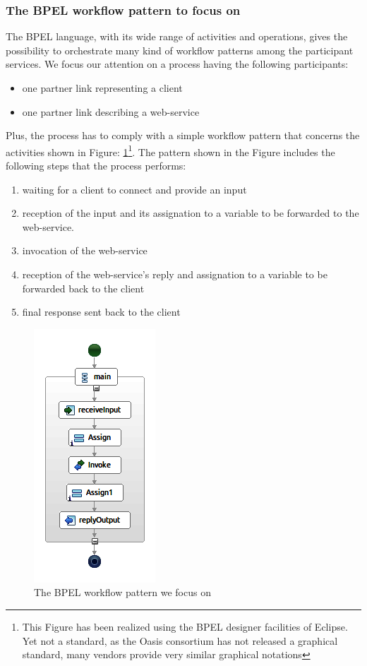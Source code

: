 \subsubsection{The BPEL workflow pattern to focus on}
\label{sec:DesignBPELPattern}
The BPEL language, with its wide range of activities and operations, gives the possibility to orchestrate many kind of workflow patterns among the participant services. We focus our attention on a process having the following participants:
\begin{itemize}
 \item one partner link representing a client
 \item one partner link describing a web-service
\end{itemize}
Plus, the process has to comply with a simple workflow pattern that concerns the activities shown in Figure: \ref{fig:BPELWorkflowPattern}\footnote{This Figure has been realized using the BPEL designer facilities of Eclipse. Yet not a standard, as the Oasis consortium has not released a graphical standard, many vendors provide very similar graphical notations}. The pattern shown in the Figure includes the following steps that the process performs:
\begin{enumerate}
 \item waiting for a client to connect and provide an input
\item reception of the input and its assignation to a variable to be forwarded to the web-service.
\item invocation of the web-service 
\item reception of the web-service's reply and assignation to a variable to be forwarded back to the client
\item final response sent back to the client
\end{enumerate}


\begin{figure}
  \begin{center}
    \includegraphics[scale=0.8]{pictures/SimpleProcessBPEL.png}
    \caption{The BPEL workflow pattern we focus on}
    \label{fig:BPELWorkflowPattern}
  \end{center}
\end{figure} 

